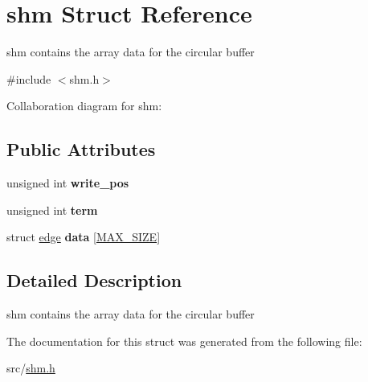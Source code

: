 \hypertarget{structshm}{}\section{shm Struct Reference}
\label{structshm}


shm contains the array data for the circular buffer  




{\ttfamily \#include $<$shm.\+h$>$}



Collaboration diagram for shm\+:
\subsection*{Public Attributes}
\begin{DoxyCompactItemize}
\item 
\mbox{\label{structshm_a44ed5360d048ac3e960d0d110ffbab5e}} 
unsigned int {\bfseries write\+\_\+pos}
\item 
\mbox{\label{structshm_abae4fa0bb181f455c6eacaa03fca7506}} 
unsigned int {\bfseries term}
\item 
\mbox{\label{structshm_ae0e17514db5f70e32857ffb320b9cf66}} 
struct \hyperlink{structedge}{edge} {\bfseries data} \mbox{[}\hyperlink{shm_8h_a0592dba56693fad79136250c11e5a7fe}{M\+A\+X\+\_\+\+S\+I\+ZE}\mbox{]}
\end{DoxyCompactItemize}


\subsection{Detailed Description}
shm contains the array data for the circular buffer 

The documentation for this struct was generated from the following file\+:\begin{DoxyCompactItemize}
\item 
src/\hyperlink{shm_8h}{shm.\+h}\end{DoxyCompactItemize}
